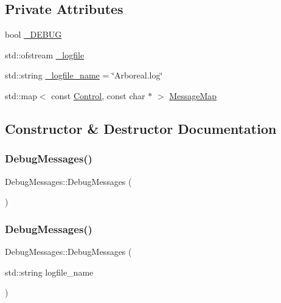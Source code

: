 \subsection*{Private Attributes}
\begin{DoxyCompactItemize}
\item 
bool \mbox{\hyperlink{class_debug_messages_ab964d3dbcf0d1ad351323bb5b0956cf1}{\+\_\+\+D\+E\+B\+UG}}
\item 
std\+::ofstream \mbox{\hyperlink{class_debug_messages_a590ca93cb60b3bc8912887e6062db082}{\+\_\+logfile}}
\item 
std\+::string \mbox{\hyperlink{class_debug_messages_a8ea5b7fdb0d5f127589fecbc444c499b}{\+\_\+logfile\+\_\+name}} = \char`\"{}Arboreal.\+log\char`\"{}
\item 
std\+::map$<$ const \mbox{\hyperlink{_debug_messages_8h_a0da83e35f29c11f7f3c637234f2149f9}{Control}}, const char $\ast$ $>$ \mbox{\hyperlink{class_debug_messages_a1069b263ae4eab6c06fb78e428f4893f}{Message\+Map}}
\end{DoxyCompactItemize}


\subsection{Constructor \& Destructor Documentation}
\mbox{\label{class_debug_messages_a7fb2c5a7cce97eb05661b1f6657cb650}} 
\subsubsection{\texorpdfstring{Debug\+Messages()}{DebugMessages()}\hspace{0.1cm}{\footnotesize\ttfamily [1/2]}}
{\footnotesize\ttfamily Debug\+Messages\+::\+Debug\+Messages (\begin{DoxyParamCaption}{ }\end{DoxyParamCaption})}

\mbox{\label{class_debug_messages_aa60430ca0e05e43a8bb27f4cdc1a158c}} 
\subsubsection{\texorpdfstring{Debug\+Messages()}{DebugMessages()}\hspace{0.1cm}{\footnotesize\ttfamily [2/2]}}
{\footnotesize\ttfamily Debug\+Messages\+::\+Debug\+Messages (\begin{DoxyParamCaption}\item[{std\+::string}]{logfile\+\_\+name }\end{DoxyParamCaption})}

